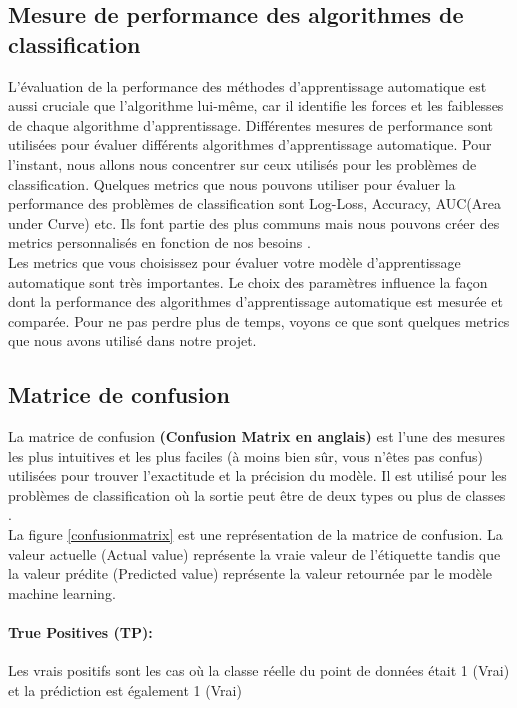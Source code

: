 \documentclass[12pt, french]{report}
\begin{document}
\subsection{Mesure de performance des algorithmes de classification}
L'évaluation de la performance des méthodes d'apprentissage automatique est aussi cruciale que l'algorithme lui-même, car il identifie les forces et les faiblesses de chaque algorithme d'apprentissage. Différentes mesures de performance sont utilisées pour évaluer différents algorithmes d'apprentissage automatique. Pour l'instant, nous allons nous concentrer sur ceux utilisés pour les problèmes de classification. Quelques metrics que nous pouvons utiliser pour évaluer la performance des problèmes de classification sont Log-Loss, Accuracy, AUC(Area under Curve) etc. Ils font partie des plus communs mais nous pouvons créer des metrics personnalisés en fonction de nos besoins \cite{key17}.\\

Les metrics que vous choisissez pour évaluer votre modèle d'apprentissage automatique sont très importantes. Le choix des paramètres influence la façon dont la performance des algorithmes d'apprentissage automatique est mesurée et comparée. Pour ne pas perdre plus de temps, voyons ce que sont quelques metrics que nous avons utilisé dans notre projet.

\subsection{Matrice de confusion}
La matrice de confusion \textbf{(Confusion Matrix en anglais)} est l'une des mesures les plus intuitives et les plus faciles (à moins bien sûr, vous n'êtes pas confus) utilisées pour trouver l'exactitude et la précision du modèle. Il est utilisé pour les problèmes de classification où la sortie peut être de deux types ou plus de classes \cite{key17}.\\

La figure \ref{confusionmatrix} est une représentation de la matrice de confusion. La valeur actuelle (Actual value) représente la vraie valeur de l'étiquette tandis que la valeur prédite (Predicted value) représente la valeur retournée par le modèle machine learning. 
\paragraph*{True Positives (TP):}
Les vrais positifs sont les cas où la classe réelle du point de données était 1 (Vrai) et la prédiction est également 1 (Vrai)
\end{document}
